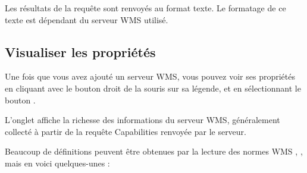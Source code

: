Les résultats de la requête sont renvoyés au format texte. Le formatage de ce texte est dépendant du serveur WMS utilisé.

\subsection{Visualiser les propriétés}
\label{sec:ogc-wms-properties}

Une fois que vous avez ajouté un serveur WMS, vous pouvez voir ses propriétés en cliquant avec le bouton droit de la souris sur sa légende, et en sélectionnant le bouton  .

\label{sec:ogc-wms-properties-metadata}

L'onglet  affiche la richesse des informations du serveur WMS, généralement collecté à partir de la requête Capabilities renvoyée par le serveur.

Beaucoup de définitions peuvent être obtenues par la lecture des normes WMS \parencite{OGCWMS010101web}, \parencite{OGCWMS010300web}, mais en voici quelques-unes :

